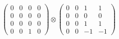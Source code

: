 \documentclass{article}
\begin{document}
{\begin{align}
            \begin{pmatrix} 0 & 0 & 0 & 0 \\ 0 & 0 & 0 & 0 \\ 0 & 0 & 0 & 0 \\ 0 & 0 & 1 & 0 \end{pmatrix} \otimes 
            \begin{pmatrix} 0 & 0 & 1 & 1 \\ 0 & 0 & 0 & 0 \\ 0 & 0 & 1 & 1 \\ 0 & 0 & -1 & -1 \end{pmatrix} 
        \end{align}
        }
        
        
        \begin{landscape}
        \resizebox{\columnwidth}{!}{
        \begin{tikzpicture}[node distance=3cm and 1cm, auto]
        

\end{tikzpicture}}
\end{landscape}
\end{document}

